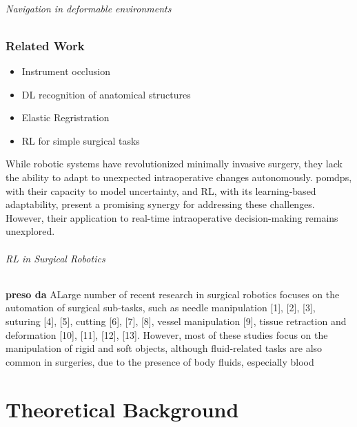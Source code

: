 \paragraph{Navigation in deformable environments}
\section{Related Work}
\begin{itemize}
    \item Instrument occlusion
    \item DL recognition of anatomical structures
    \item Elastic Regristration
    \item RL for simple surgical tasks
\end{itemize}

While robotic systems have revolutionized minimally invasive surgery, they lack the 
ability to adapt to unexpected intraoperative changes autonomously. \gls{pomdp}s, with 
their capacity to model uncertainty, and RL, with its learning-based adaptability, 
present a promising synergy for addressing these challenges. However, their 
application to real-time intraoperative decision-making remains unexplored.


\paragraph{RL in Surgical Robotics}
\textbf{preso da} \citet{10578312}
ALarge number of recent research in surgical robotics
focuses on the automation of surgical sub-tasks, such
as needle manipulation [1], [2], [3], suturing [4], [5], cutting
[6], [7], [8], vessel manipulation [9], tissue retraction and
deformation [10], [11], [12], [13]. However, most of these
studies focus on the manipulation of rigid and soft objects,
although fluid-related tasks are also common in surgeries, due
to the presence of body fluids, especially blood 


\part{Theoretical Background}

